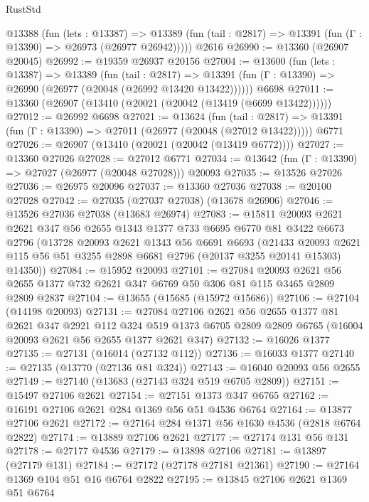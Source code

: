 \begin{lexlean}{RustStd}
\begin{coremodule}
    @13388
      (fun (lets : @13387) =>
      @13389 (fun (tail : @2817) => @13391 (fun (Γ : @13390) => @26973 (@26977 @26942)))))
    @2616
@26990 := @13360 (@26907 @20045)
@26992 := @19359 @26937 @20156
@27004 := @13600
    (fun (lets : @13387) =>
    @13389
      (fun (tail : @2817) =>
      @13391 (fun (Γ : @13390) => @26990 (@26977 (@20048 (@26992 @13420 @13422))))))
    @6698
@27011 := @13360 (@26907 (@13410 (@20021 (@20042 (@13419 (@6699 @13422))))))
@27012 := @26992 @6698
@27021 := @13624
    (fun (tail : @2817) => @13391 (fun (Γ : @13390) => @27011 (@26977 (@20048 (@27012 @13422)))))
    @6771
@27026 := @26907 (@13410 (@20021 (@20042 (@13419 @6772))))
@27027 := @13360 @27026
@27028 := @27012 @6771
@27034 := @13642 (fun (Γ : @13390) => @27027 (@26977 (@20048 @27028))) @20093
@27035 := @13526 @27026
@27036 := @26975 @20096
@27037 := @13360 @27036
@27038 := @20100 @27028
@27042 := @27035 (@27037 @27038) (@13678 @26906)
@27046 := @13526 @27036 @27038 (@13683 @26974)
@27083 := @15811
    @20093
    @2621
    @2621
    @347
    @56
    @2655
    @1343
    @1377
    @733
    @6695
    @6770
    @81
    @3422
    @6673
    @2796
    (@13728
      @20093
      @2621
      @1343
      @56
      @6691
      @6693
      (@21433
        @20093
        @2621
        @115
        @56
        @51
        @3255
        @2898
        @6681
        @2796
        (@20137 @3255 @20141 @15303)
        @14350))
@27084 := @15952 @20093
@27101 := @27084
    @20093
    @2621
    @56
    @2655
    @1377
    @732
    @2621
    @347
    @6769
    @50
    @306
    @81
    @115
    @3465
    @2809
    @2809
    @2837
@27104 := @13655 (@15685 (@15972 @15686))
@27106 := @27104 (@14198 @20093)
@27131 := @27084
    @27106
    @2621
    @56
    @2655
    @1377
    @81
    @2621
    @347
    @2921
    @112
    @324
    @519
    @1373
    @6705
    @2809
    @2809
    @6765
    (@16004 @20093 @2621 @56 @2655 @1377 @2621 @347)
@27132 := @16026 @1377
@27135 := @27131 (@16014 (@27132 @112))
@27136 := @16033 @1377
@27140 := @27135 (@13770 (@27136 @81 @324))
@27143 := @16040 @20093 @56 @2655
@27149 := @27140 (@13683 (@27143 @324 @519 @6705 @2809))
@27151 := @15497 @27106 @2621
@27154 := @27151 @1373 @347 @6765
@27162 := @16191 @27106 @2621 @284 @1369 @56 @51 @4536 @6764
@27164 := @13877 @27106 @2621
@27172 := @27164 @284 @1371 @56 @1630 @4536 (@2818 @6764 @2822)
@27174 := @13889 @27106 @2621
@27177 := @27174 @131 @56 @131
@27178 := @27177 @4536
@27179 := @13898 @27106
@27181 := @13897 (@27179 @131)
@27184 := @27172 (@27178 @27181 @21361)
@27190 := @27164 @1369 @104 @51 @16 @6764 @2822
@27195 := @13845 @27106 @2621 @1369 @51 @6764

\end{coremodule}
\end{lexlean}
